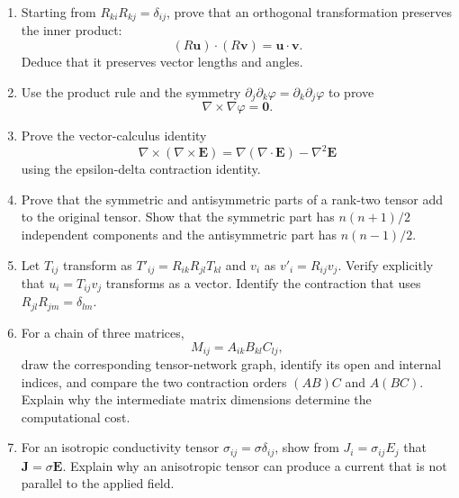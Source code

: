 \begin{enumerate}
    \item\label{ex:index-orthogonal} Starting from $R_{ki}R_{kj}=\delta_{ij}$, prove that an orthogonal transformation preserves the inner product:
    \begin{equation*}
        (R\mathbf{u})\cdot(R\mathbf{v})=\mathbf{u}\cdot\mathbf{v}.
    \end{equation*}
    Deduce that it preserves vector lengths and angles.

    \item\label{ex:index-curl-gradient} Use the product rule and the symmetry $\partial_j\partial_k\varphi=\partial_k\partial_j\varphi$ to prove
    \begin{equation*}
        \nabla\times\nabla\varphi=\mathbf{0}.
    \end{equation*}

    \item\label{ex:index-curl-curl} Prove the vector-calculus identity
    \begin{equation*}
        \nabla\times(\nabla\times\mathbf{E})
        =\nabla(\nabla\cdot\mathbf{E})-\nabla^2\mathbf{E}
    \end{equation*}
    using the epsilon-delta contraction identity.

    \item\label{ex:tensor-symmetry} Prove that the symmetric and antisymmetric parts of a rank-two tensor add to the original tensor. Show that the symmetric part has $n(n+1)/2$ independent components and the antisymmetric part has $n(n-1)/2$.

    \item\label{ex:tensor-transformation} Let $T_{ij}$ transform as $T'_{ij}=R_{ik}R_{jl}T_{kl}$ and $v_i$ as $v'_i=R_{ij}v_j$. Verify explicitly that $u_i=T_{ij}v_j$ transforms as a vector. Identify the contraction that uses $R_{jl}R_{jm}=\delta_{lm}$.

    \item\label{ex:tensor-network} For a chain of three matrices,
    \begin{equation*}
        M_{ij}=A_{ik}B_{kl}C_{lj},
    \end{equation*}
    draw the corresponding tensor-network graph, identify its open and internal indices, and compare the two contraction orders $(AB)C$ and $A(BC)$. Explain why the intermediate matrix dimensions determine the computational cost.

    \item\label{ex:tensor-conductivity} For an isotropic conductivity tensor $\sigma_{ij}=\sigma\delta_{ij}$, show from $J_i=\sigma_{ij}E_j$ that $\mathbf{J}=\sigma\mathbf{E}$. Explain why an anisotropic tensor can produce a current that is not parallel to the applied field.


\end{enumerate}
